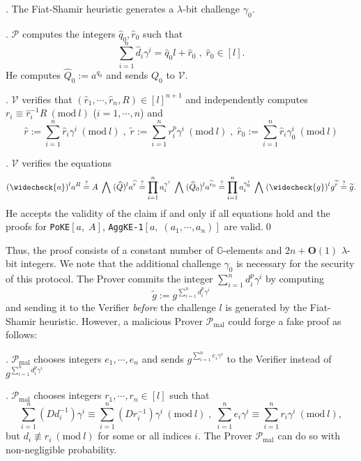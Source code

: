 \documentclass[11pt, lettersize, notitlepage, leqno, footskip=0.6cm]{article}
\newcommand{\pl}{\prod\limits}
\newcommand{\slim}{\sum\limits}
\newcommand{\wti}{\widetilde}
\newcommand{\mc}{\mathcal}
\newcommand{\mb}{\mathbb}
\newcommand{\mbf}{\mathbf}
\newcommand{\mr}{\mathrm}
\newcommand{\lam}{\lambda}
\newcommand{\what}{\widehat}
\newcommand{\weck}{\widecheck}
\newcommand{\bO}{\mbf{O}}
\newcommand{\mP}{\mc{P}}
\newcommand{\vs}{\vspace{-0.15cm}}
\newcommand{\noin}{\noindent}
\newcommand{\sta}{\stackrel{?}{=}}
\newcommand{\Mod}[1]{\ (\mathrm{mod}\ #1)}
\numberwithin{equation}{section}
\begin{document}
\begin{enumerate}[wide, labelwidth=!, labelindent=0pt]
\noin 9. The Fiat-Shamir heuristic generates a $\lam$-bit challenge $\gamma_0$.

\noin 10. $\mc{P}$ computes the integers $\what{q}_0,\what{r}_0$ such that \vs $$\slim_{i=1}^n \what{d}_i\gamma^i = \what{q}_0l+\what{r}_0\;,\;\what{r}_0\in[l].$$ He computes $\what{Q}_0:= a^{q_0}$ and sends ${Q}_0$ to $\mc{V}$.

\noin 11. $\mc{V}$ verifies that $(\what{r}_1,\cdots,\what{r}_n, R)\in [l]^{n+1}$ and independently computes $r_i\equiv \what{r}_i^{-1}R\Mod{l}$ ($i=1,\cdots,n$) and \vs $$\what{r}:= \slim_{i=1}^n \what{r}_i\gamma^i\Mod{l}\;,\;\wti{r}:= {\slim_{i=1}^n r_i^{p}\gamma^i}\Mod{l}\;,\; \what{r}_0:= \slim_{i=1}^n \what{r}_i\gamma_0^i\Mod{l}$$

\noin 12. $\mc{V}$ verifies the equations \vs $$(\weck{a})^la^R\sta A  \;\bigwedge\; (\what{Q})^l a^{\what{r}}\sta \pl_{i=1}^{n} a_i^{\gamma^i}\;\bigwedge\;(\what{Q}_0)^la^{\what{r}_0}\sta \pl_{i=1}^{n} a_i^{\gamma_0^i} \;\bigwedge\; (\weck{g})^lg^{\wti{r}} \sta \wti{g}.$$ He accepts the validity of the claim if and only if all equations hold and the proofs for \verb|PoKE|$[a,\;A]$, \verb|AggKE-1|$[a,\;(a_1,\cdots,a_n)]$ are valid.\qed \end{enumerate}

\vspace{0.2cm}

Thus, the proof consists of a constant number of $\mb{G}$-elements and $2n+\bO(1)$ $\lam$-bit integers. We note that the additional challenge $\gamma_0$ is necessary for the security of this protocol. The Prover commits the integer $\slim_{i=1}^n d_i^{p}\gamma^i$ by computing \vspace{-0.4cm} $$\wti{g} := g^{\slim_{i=1}^n d_i^{p}\gamma^i}$$ and sending it to the Verifier \textit{before} the challenge $l$ is generated by the Fiat-Shamir heuristic. However, a malicious Prover $\mP_{\mr{mal}}$ could forge a fake proof as follows:

\noin 1. $\mP_{\mr{mal}}$ chooses integers $e_1,\cdots,e_n$ and sends $g^{\slim_{i=1}^n e_i\gamma^i}$ to the Verifier instead of $g^{\slim_{i=1}^n d_i^{p}\gamma^i}$

\noin 2. $\mP_{\mr{mal}}$ chooses integers $r_1,\cdots,r_n\in [l]$ such that \vs $$\slim_{i=1}^n (Dd_i^{-1})\gamma^i \equiv \slim_{i=1}^n (Dr_i^{-1})\gamma^i \Mod{l}\;,\; \slim_{i=1}^n e_i\gamma^i\equiv \slim_{i=1}^n r_i\gamma^i \Mod{l},$$ but $d_i\not\equiv r_i\Mod{l}$ for some or all indices $i$. The Prover $\mP_{\mr{mal}}$ can do so  with non-negligible probability.
\end{document}

